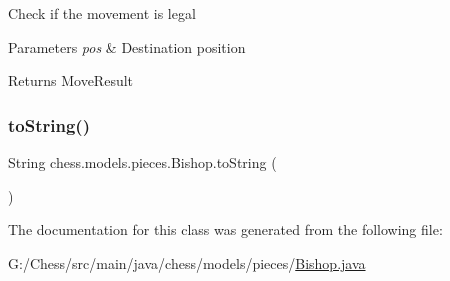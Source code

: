 Check if the movement is legal


\begin{DoxyParams}{Parameters}
{\em pos} & Destination position \\
\hline
\end{DoxyParams}
\begin{DoxyReturn}{Returns}
Move\+Result 
\end{DoxyReturn}
\mbox{\label{classchess_1_1models_1_1pieces_1_1_bishop_abbdf19ca47acb189eeaa49931eb2f30c}} 
\subsubsection{\texorpdfstring{to\+String()}{toString()}}
{\footnotesize\ttfamily String chess.\+models.\+pieces.\+Bishop.\+to\+String (\begin{DoxyParamCaption}{ }\end{DoxyParamCaption})}



The documentation for this class was generated from the following file\+:\begin{DoxyCompactItemize}
\item 
G\+:/\+Chess/src/main/java/chess/models/pieces/\mbox{\hyperlink{_bishop_8java}{Bishop.\+java}}\end{DoxyCompactItemize}
